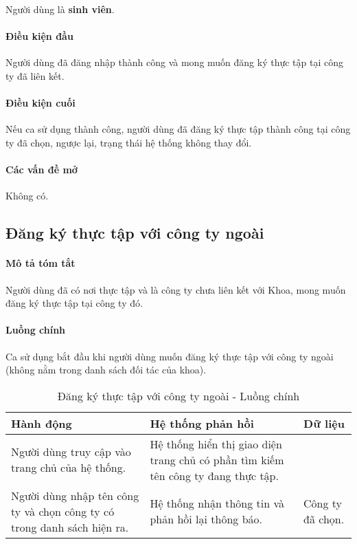 \documentclass[./../main.tex]{subfiles}
\begin{document}
Người dùng là \textbf{sinh viên}.

\paragraph*{Điều kiện đầu}

Người dùng đã đăng nhập thành công và mong muốn đăng ký thực tập tại
công ty đã liên kết.

\paragraph*{Điều kiện cuối}

Nếu ca sử dụng thành công, người dùng đã đăng ký thực tập thành công tại
công ty đã chọn, ngược lại, trạng thái hệ thống không thay đổi.

\paragraph*{Các vấn đề mở}

Không có.

\subsection{Đăng ký thực tập với công ty ngoài}

\paragraph*{Mô tả tóm tắt}

Người dùng đã có nơi thực tập và là công ty chưa liên kết với Khoa, mong
muốn đăng ký thực tập tại công ty đó.

\paragraph*{Luồng chính} Ca sử dụng bắt đầu khi người dùng muốn đăng ký thực tập với công ty ngoài (không nằm trong danh sách đối tác của khoa).

\begin{table}[H]
  \caption{Đăng ký thực tập với công ty ngoài - Luồng chính}
  \label{tab:register_other_company}
  \begin{tabularx}{\textwidth}{|X|X|X|}
  \hline
  \textbf{Hành động}                                                      & \textbf{Hệ thống phản hồi}                                                        & \textbf{Dữ liệu} \\ \hline
  Người dùng truy cập vào trang chủ của hệ thống.                         & Hệ thống hiển thị giao diện trang chủ có phần tìm kiếm tên công ty đang thực tập. &                  \\ \hline
  Người dùng nhập tên công ty và chọn công ty có trong danh sách hiện ra. & Hệ thống nhận thông tin và phản hồi lại thông báo.                                & Công ty đã chọn. \\ \hline
  \end{tabularx}
\end{table}
\end{document}
